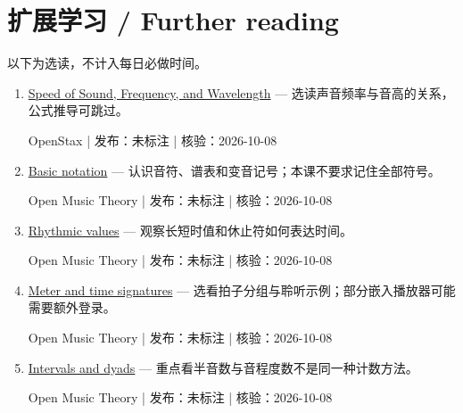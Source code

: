 \documentclass[11pt]{article}
\newcommand{\Needspace}[1]{\par\ifdim\dimexpr\pagegoal-\pagetotal\relax<#1\relax\newpage\fi}
\begin{document}
\Needspace{6\baselineskip}\section*{扩展学习 / Further reading}\small 以下为选读，不计入每日必做时间。\begin{enumerate}[leftmargin=1.6em]

\item [S1] \href{https://openstax.org/books/physics/pages/14-1-speed-of-sound-frequency-and-wavelength}{Speed of Sound, Frequency, and Wavelength} — 选读声音频率与音高的关系，公式推导可跳过。\par OpenStax | 发布：未标注 | 核验：2026-10-08

\item [S2] \href{https://openmusictheory.github.io/basicNotation.html}{Basic notation} — 认识音符、谱表和变音记号；本课不要求记住全部符号。\par Open Music Theory | 发布：未标注 | 核验：2026-10-08

\item [S3] \href{https://openmusictheory.github.io/rhythmicValues.html}{Rhythmic values} — 观察长短时值和休止符如何表达时间。\par Open Music Theory | 发布：未标注 | 核验：2026-10-08

\item [S4] \href{https://openmusictheory.github.io/meter.html}{Meter and time signatures} — 选看拍子分组与聆听示例；部分嵌入播放器可能需要额外登录。\par Open Music Theory | 发布：未标注 | 核验：2026-10-08

\item [S5] \href{https://openmusictheory.github.io/intervals.html}{Intervals and dyads} — 重点看半音数与音程度数不是同一种计数方法。\par Open Music Theory | 发布：未标注 | 核验：2026-10-08

\end{enumerate}
\end{document}

